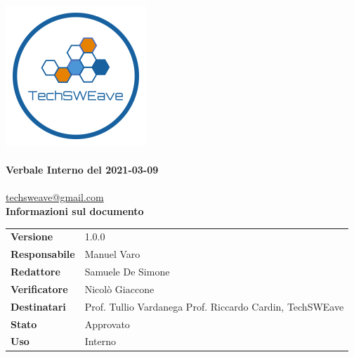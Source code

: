 \documentclass[a4paper]{article}
\begin{document}
\begin{titlepage}
    \begin{center}
        \includegraphics{../../../../Images/logo}\\
        \vspace{20px}
        \textcolor{logo}{\hrulefill}\\
        \vspace{20px}
        \textbf{\huge\textcolor{logo}{Verbale Interno del 2021-03-09}}\\
        \vspace{10px}
        \textcolor{logo}{\hrulefill}\\
        \vspace{20px}
        \href{mailto:techsweave@gmail.com}{techsweave@gmail.com}\\
        \vspace{40px}
        \textbf{Informazioni sul documento}\\
        \vspace{20px}
        \begin{tabular}{p{100px} | p{100px}}
            \textbf{Versione} & 1.0.0\\
            \textbf{Responsabile} & Manuel Varo\\
            \textbf{Redattore} & Samuele De Simone\\
            \textbf{Verificatore} & Nicolò Giaccone\\
            \textbf{Destinatari} & Prof. Tullio Vardanega \newline Prof. Riccardo Cardin, \newline TechSWEave\\
            \textbf{Stato} & Approvato\\
            \textbf{Uso} & Interno\\
        \end{tabular}
            \vspace{1ex}

    \end{center}
    \end{titlepage}
\end{document}
